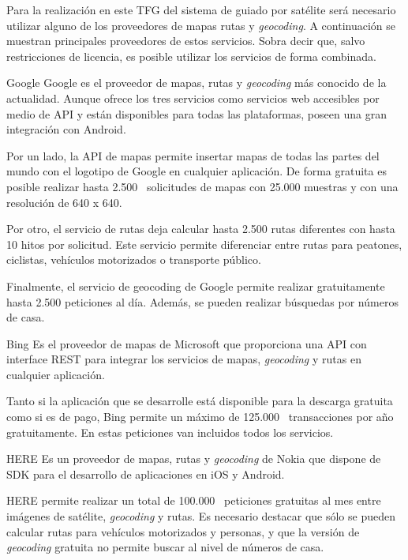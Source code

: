 Para la realización en este \acs{TFG} del sistema de guiado por satélite será necesario utilizar
alguno de los proveedores de mapas rutas y \emph{geocoding}. A continuación se muestran principales
proveedores de estos servicios. Sobra decir que, salvo restricciones de licencia, es posible
utilizar los servicios de forma combinada.

\begin{definitionlist}
  \item[Google] Google es el proveedor de mapas, rutas y \emph{geocoding} más conocido de la
    actualidad. Aunque ofrece los tres servicios como servicios web accesibles por medio de
    \acs{API} y están disponibles para todas las plataformas, poseen una gran integración con
    Android.

    Por un lado, la \acs{API} de mapas permite insertar mapas de todas las partes del mundo con el
    logotipo de Google en cualquier aplicación. De forma gratuita es posible realizar hasta
    2.500~\cite{LicenciaAndroid} solicitudes de mapas con 25.000 muestras y con una resolución de
    640 x 640.

    Por otro, el servicio de rutas deja calcular hasta 2.500 rutas diferentes con hasta 10
    hitos por solicitud. Este servicio permite diferenciar entre rutas para peatones, ciclistas,
    vehículos motorizados o transporte público.

    Finalmente, el servicio de geocoding de Google permite realizar gratuitamente hasta 2.500
    peticiones al día. Además, se pueden realizar búsquedas por números de casa.

  \item[Bing] Es el proveedor de mapas de Microsoft que proporciona una \acs{API} con interface
    \acf{REST} para integrar los servicios de mapas, \emph{geocoding} y rutas en cualquier
    aplicación.

    Tanto si la aplicación que se desarrolle está disponible para la descarga gratuita como si es de
    pago, Bing permite un máximo de 125.000~\cite{LicenciaMicrosoft} transacciones por año
    gratuitamente. En estas peticiones van incluidos todos los servicios.

  \item[HERE] Es un proveedor de mapas, rutas y \emph{geocoding} de Nokia que dispone de \acf{SDK}
    para el desarrollo de aplicaciones en iOS y Android.

    HERE permite realizar un total de 100.000~\cite{LicenciaHERE} peticiones gratuitas al mes entre
    imágenes de satélite, \emph{geocoding} y rutas. Es necesario destacar que sólo se pueden
    calcular rutas para vehículos motorizados y personas, y que la versión de \emph{geocoding}
    gratuita no permite buscar al nivel de números de casa.


\end{definitionlist}

